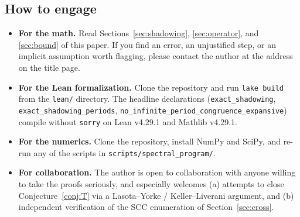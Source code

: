 \documentclass[11pt,a4paper]{article}
\theoremstyle{definition}
\begin{document}
\subsection{How to engage}
\begin{itemize}
  \item \textbf{For the math.} Read Sections~\ref{sec:shadowing},
        \ref{sec:operator}, and \ref{sec:bound} of this paper. If
        you find an error, an unjustified step, or an implicit
        assumption worth flagging, please contact the author at
        the address on the title page.
  \item \textbf{For the Lean formalization.} Clone the repository
        and run \texttt{lake build} from the \texttt{lean/}
        directory. The headline declarations
        (\texttt{exact\_shadowing},
        \texttt{exact\_shadowing\_periods},
        \texttt{no\_infinite\_period\_congruence\_expansive})
        compile without \texttt{sorry} on Lean v4.29.1 and
        Mathlib v4.29.1.
  \item \textbf{For the numerics.} Clone the repository, install
        NumPy and SciPy, and re-run any of the scripts in
        \texttt{scripts/spectral\_program/}.
  \item \textbf{For collaboration.} The author is open to
        collaboration with anyone willing to take the proofs
        seriously, and especially welcomes (a) attempts to close
        Conjecture~\ref{conj:T} via a Lasota--Yorke /
        Keller--Liverani argument, and (b) independent
        verification of the SCC enumeration of
        Section~\ref{sec:cross}.
\end{itemize}
\end{document}
